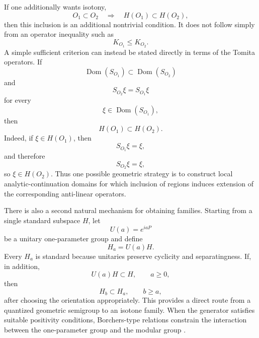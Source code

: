 \documentclass[a4paper,11pt]{article}
\theoremstyle{definition}
\newcommand{\Dom}{\operatorname{Dom}}
\begin{document}
If one additionally wants isotony,
\begin{equation}
    O_1\subset O_2
    \quad\Longrightarrow\quad
    H(O_1)\subset H(O_2),
    \label{eq:ssgq:isotony}
\end{equation}
then this inclusion is an additional nontrivial condition.  It does not
follow simply from an operator inequality such as
\begin{equation}
    K_{O_1}\leq K_{O_2}.
\end{equation}
A simple sufficient criterion can instead be stated directly in terms of the
Tomita operators.  If
\begin{equation}
    \Dom(S_{O_1})\subset\Dom(S_{O_2})
\end{equation}
and
\begin{equation}
    S_{O_2}\xi
    =
    S_{O_1}\xi
\end{equation}
for every
\begin{equation}
    \xi\in\Dom(S_{O_1}),
\end{equation}
then
\begin{equation}
    H(O_1)\subset H(O_2).
\end{equation}
Indeed, if $\xi\in H(O_1)$, then
\begin{equation}
    S_{O_1}\xi=\xi,
\end{equation}
and therefore
\begin{equation}
    S_{O_2}\xi=\xi,
\end{equation}
so $\xi\in H(O_2)$.  Thus one possible geometric strategy is to construct
local analytic-continuation domains for which inclusion of regions induces
extension of the corresponding anti-linear operators.

There is also a second natural mechanism for obtaining families.  Starting
from a single standard subspace $H$, let
\begin{equation}
    U(a)=e^{iaP}
\end{equation}
be a unitary one-parameter group and define
\begin{equation}
    H_a=U(a)H.
\end{equation}
Every $H_a$ is standard because unitaries preserve cyclicity and
separatingness.  If, in addition,
\begin{equation}
    U(a)H\subset H,
    \qquad
    a\geq0,
\end{equation}
then
\begin{equation}
    H_b\subset H_a,
    \qquad
    b\geq a,
\end{equation}
after choosing the orientation appropriately.  This provides a direct route
from a quantized geometric semigroup to an isotone family.  When the
generator satisfies suitable positivity conditions, Borchers-type relations
constrain the interaction between the one-parameter group and the modular
group \cite{BrunettiGuidoLongo2002,Longo2008}.
\end{document}
